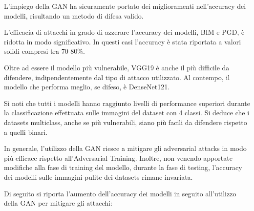             L'impiego della GAN ha sicuramente portato dei miglioramenti nell'accuracy dei modelli, risultando un metodo di difesa valido.
            
            L'efficacia di attacchi in grado di azzerare l'accuracy dei modelli, BIM e PGD, è ridotta in modo significativo. In questi casi l'accuracy è stata riportata a valori solidi compresi tra 70-80\%.
            
            Oltre ad essere il modello più vulnerabile, VGG19 è anche il più difficile da difendere, indipendentemente dal tipo di attacco utilizzato. Al contempo, il modello che performa meglio, se difeso, è DenseNet121.
            
            Si noti che tutti i modelli hanno raggiunto livelli di performance superiori durante la classificazione effettuata sulle immagini del dataset con 4 classi. Si deduce che i datasets multiclass, anche se più vulnerabili, siano più facili da difendere rispetto a quelli binari.   
            
            In generale, l'utilizzo della GAN riesce a mitigare gli adversarial attacks in modo più efficace rispetto all'Adversarial Training. Inoltre, non venendo apportate modifiche alla fase di training del modello, durante la fase di testing, l'accuracy dei modelli sulle immagini pulite dei datasets rimane invariata. 
            
            \newpage
            Di seguito si riporta l'aumento dell’accuracy dei modelli in seguito all’utilizzo della GAN per mitigare gli attacchi:
            
